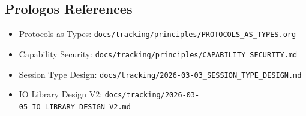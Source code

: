 \documentclass[11pt]{article}
\begin{document}
\subsection{Prologos References}
\label{sec:org4527981}

\begin{itemize}
\item Protocols as Types: \texttt{docs/tracking/principles/PROTOCOLS\_AS\_TYPES.org}
\item Capability Security: \texttt{docs/tracking/principles/CAPABILITY\_SECURITY.md}
\item Session Type Design: \texttt{docs/tracking/2026-03-03\_SESSION\_TYPE\_DESIGN.md}
\item IO Library Design V2: \texttt{docs/tracking/2026-03-05\_IO\_LIBRARY\_DESIGN\_V2.md}
\end{itemize}
\end{document}
